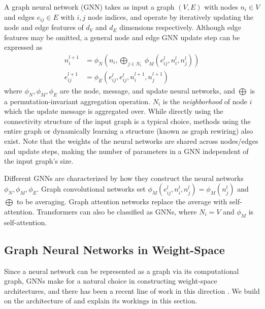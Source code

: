 A graph neural network (GNN) \citep{wuGraphNeuralNetworks2022} takes as input a graph $(V,E)$ with nodes $n_i \in V$ and edges $e_{ij} \in E$ with $i,j$ node indices, and operate by iteratively updating the node and edge features of $d_V$ and $d_E$ dimensions respectively. Although edge features may be omitted, a general node and edge GNN update step can be expressed as
\begin{align} \label{eq:mpnn}
    n_i^{l + 1} &=
    \phi_N \left( n_i, \bigoplus_{j \in N_i} \
                    \phi_M(e_{ij}^l, n_i^l, n_j^l) \right) \\
    e_{ij}^{l+1} &= \phi_E \left(
        e_{ij}^l, e_{ij}^l, n_i^{l+1} , n_j^{l+1} 
        \label{eq:edge_updates}
    \right)
\end{align}
where $\phi_N, \phi_M, \phi_E$ are the node, message, and update neural networks, and $\bigoplus$ is a permutation-invariant aggregation operation. $N_i$ is the \textit{neighborhood} of node $i$ which the update message is aggregated over. While directly using the connectivity structure of the input graph is a typical choice, methods using the entire graph \citep{diaoRelationalAttentionGeneralizing2023} or dynamically learning a structure (known as graph rewiring) \citep{gutteridgeDRewDynamicallyRewired2023} also exist.   Note that the weights of the neural networks are shared across nodes/edges and update steps, making the number of parameters in a GNN independent of the input graph's size. 

Different GNNs are characterized by how they construct the neural networks $\phi_N, \phi_M, \phi_E$. Graph convolutional networks \citep{kipfSemiSupervisedClassificationGraph2016} set $\phi_M(e_{ij}^l, n_i^l, n_j^l) = \phi_M(n_j^l)$ and $\bigoplus$ to be averaging. Graph attention networks \citep{velickovicGraphAttentionNetworks2018a} replace the average with self-attention. Transformers \citep{vaswaniAttentionAllYou2017a} can also be classified as GNNs, where $N_i = V$ and $\phi_M$ is self-attention.

\subsection{Graph Neural Networks in Weight-Space}

Since a neural network can be represented as a graph via its computational graph, GNNs make for a natural choice in constructing weight-space architectures, and there has been a recent line of work in this direction \citep{zhouNeuralFunctionalTransformers2023, limGraphMetanetworksProcessing2023, kofinasGraphNeuralNetworks2024,kalogeropoulosScaleEquivariantGraph2024}. We build on the architecture of \citep{kofinasGraphNeuralNetworks2024} and explain its workings in this section. 

